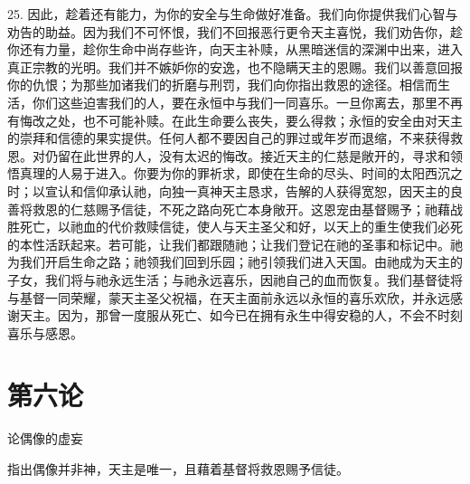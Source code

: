 25. 因此，趁着还有能力，为你的安全与生命做好准备。我们向你提供我们心智与劝告的助益。因为我们不可怀恨，我们不回报恶行更令天主喜悦，我们劝告你，趁你还有力量，趁你生命中尚存些许，向天主补赎，从黑暗迷信的深渊中出来，进入真正宗教的光明。我们并不嫉妒你的安逸，也不隐瞒天主的恩赐。我们以善意回报你的仇恨；为那些加诸我们的折磨与刑罚，我们向你指出救恩的途径。相信而生活，你们这些迫害我们的人，要在永恒中与我们一同喜乐。一旦你离去，那里不再有悔改之处，也不可能补赎。在此生命要么丧失，要么得救；永恒的安全由对天主的崇拜和信德的果实提供。任何人都不要因自己的罪过或年岁而退缩，不来获得救恩。对仍留在此世界的人，没有太迟的悔改。接近天主的仁慈是敞开的，寻求和领悟真理的人易于进入。你要为你的罪祈求，即使在生命的尽头、时间的太阳西沉之时；以宣认和信仰承认祂，向独一真神天主恳求，告解的人获得宽恕，因天主的良善将救恩的仁慈赐予信徒，不死之路向死亡本身敞开。这恩宠由基督赐予；祂藉战胜死亡，以祂血的代价救赎信徒，使人与天主圣父和好，以天上的重生使我们必死的本性活跃起来。若可能，让我们都跟随祂；让我们登记在祂的圣事和标记中。祂为我们开启生命之路；祂领我们回到乐园；祂引领我们进入天国。由祂成为天主的子女，我们将与祂永远生活；与祂永远喜乐，因祂自己的血而恢复。我们基督徒将与基督一同荣耀，蒙天主圣父祝福，在天主面前永远以永恒的喜乐欢欣，并永远感谢天主。因为，那曾一度服从死亡、如今已在拥有永生中得安稳的人，不会不时刻喜乐与感恩。\par



\section{第六论}

论偶像的虚妄\par

指出偶像并非神，天主是唯一，且藉着基督将救恩赐予信徒。\par

\par

